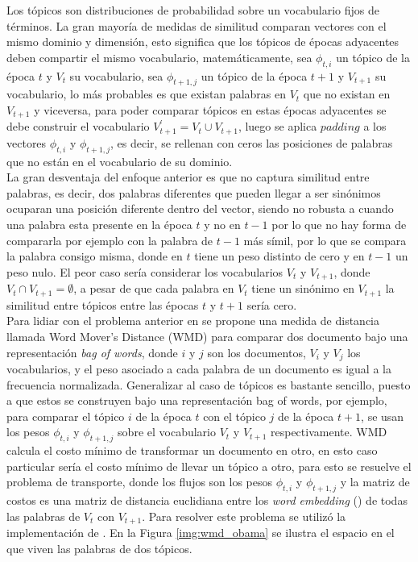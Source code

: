 \documentclass[letterpaper,12pt,oneside]{book} %
\begin{document}
Los tópicos son distribuciones de probabilidad sobre un vocabulario fijos de términos. La gran mayoría de medidas de similitud comparan vectores con el mismo dominio y dimensión, esto significa que los tópicos de épocas adyacentes deben compartir el mismo vocabulario, matemáticamente, sea $\phi_{t, i}$ un tópico de la época $t$ y $V_{t}$ su vocabulario, sea  $\phi_{t+1, j}$ un tópico de la época $t+1$ y $V_{t+1}$ su vocabulario, lo más probables es que existan palabras en $V_{t}$ que no existan en $V_{t+1}$ y viceversa, para poder comparar tópicos en estas épocas adyacentes se debe construir el vocabulario $V_{t+1}^{'}=V_{t}\cup V_{t+1}$, luego se aplica $padding$ a los vectores $\phi_{t, i}$ y $\phi_{t+1, j}$, es decir, se rellenan con ceros las posiciones de palabras que no están en el vocabulario de su dominio.\\

La gran desventaja del enfoque anterior es que no captura similitud entre palabras, es decir, dos palabras diferentes que pueden llegar a ser sinónimos ocuparan una posición diferente dentro del vector, siendo no robusta a cuando una palabra esta presente en la época $t$ y no en $t-1$ por lo que no hay forma de compararla por ejemplo con la palabra de $t-1$ más símil, por lo que se compara la palabra consigo misma, donde en $t$ tiene un peso distinto de cero y en $t-1$ un peso nulo. El peor caso sería considerar los vocabularios $V_{t}$ y $V_{t+1}$, donde $V_{t}\cap V_{t+1} =  \emptyset$, a pesar de que cada palabra en $V_{t}$ tiene un sinónimo en $V_{t+1}$ la similitud entre tópicos entre las épocas $t$ y $t+1$ sería cero.\\

Para lidiar con el problema anterior en \citep{kusner2015word} se propone una medida de distancia llamada Word Mover's Distance (WMD) para comparar dos documento bajo una representación \textit{bag of words}, donde $i$ y $j$ son los documentos, $V_{i}$ y $V_{j}$ los vocabularios, y el peso asociado a cada palabra de un documento  es igual a la frecuencia normalizada. Generalizar al caso de tópicos es bastante sencillo, puesto a que estos se construyen bajo una representación bag of words, por ejemplo, para comparar el tópico $i$ de la época $t$ con el tópico $j$ de la época $t+1$, se usan los pesos $\phi_{t,i}$ y $\phi_{t+1,j}$ sobre el vocabulario $V_{t}$ y $V_{t+1}$ respectivamente. WMD calcula el costo mínimo de transformar un documento en otro, en esto caso particular sería el costo mínimo de llevar un tópico a otro, para esto se resuelve el problema de transporte, donde los flujos son los pesos $\phi_{t,i}$ y $\phi_{t+1,j}$ y la matriz de costos es una matriz de distancia euclidiana entre los \textit{word embedding} (\cite{mikolov2013distributed}) de todas las palabras de $V_{t}$ con $V_{t+1}$. Para resolver este problema se utilizó la implementación de \citep{PyEMD}. En la Figura \ref{img:wmd_obama} se ilustra el espacio en el que viven las palabras de dos tópicos.
\end{document}
